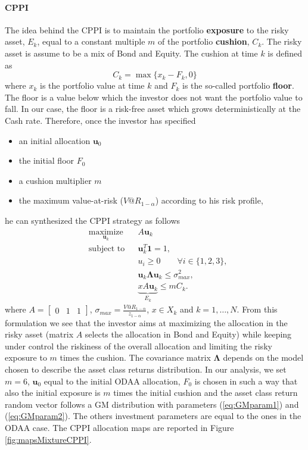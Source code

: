 \paragraph{CPPI}
The idea behind the \gls{CPPI} is to maintain the portfolio \textbf{exposure} to the risky asset, $E_k$, equal to a constant multiple $m$ of the portfolio \textbf{cushion}, $C_k$. The risky asset is assume to be a mix of Bond and Equity. The cushion at time $k$ is defined as
\[
C_k = \max\big\{x_k-F_k,0 \big\}
\]
where $x_k$ is the portfolio value at time $k$ and $F_k$ is the so-called portfolio \textbf{floor}. The floor is a value below which the investor does not want the portfolio value to fall. In our case, the floor is a risk-free asset which grows deterministically at the Cash rate. Therefore, once the investor has specified 
\begin{itemize}
	\item an initial allocation $\bm{u}_0$ 
	\item the initial floor $F_0$ 
	\item a cushion multiplier $m$
	\item the maximum value-at-risk ($V@R_{1-\alpha}$) according to his risk profile,
\end{itemize}
he can synthesized the \gls{CPPI} strategy as follows
\begin{equation*}
\begin{aligned}
& \underset{\bm{u}_k}{\text{maximize}} & &  A\bm{u}_k \\
& \text{subject to} & & \bm{u}_k^T\bm{1}=1, \\
& & & u_i \geq 0 \qquad \forall i \in \{1,2,3\},\\
& & &\bm{u}_k\bm{\Lambda}\bm{u}_k \leq \sigma_{max}^2,\\
& & & \underbrace{xA\bm{u}_k}_{E_k} \leq mC_k.
\end{aligned}
\end{equation*}
where $A=\begin{bmatrix}0 & 1 & 1\end{bmatrix}$, $\sigma_{max}=\frac{V@R_{1-\alpha}}{z_{1-\alpha}}$, $x \in X_k$ and $k = 1,\ldots,N$. From this formulation we see that the investor aims at maximizing the allocation in the risky asset (matrix $A$ selects the allocation in Bond and Equity) while keeping under control the riskiness of the overall allocation and limiting the risky exposure to $m$ times the cushion. The covariance matrix $\bm{\Lambda}$ depends on the model chosen to describe the asset class returns distribution. In our analysis, we set $m=6$, $\bm{u}_0$ equal to the initial ODAA allocation, $F_0$ is chosen in such a way that also the initial exposure is $m$ times the initial cushion and the asset class return random vector follows a GM distribution with parameters (\ref{eq:GMparam1}) and (\ref{eq:GMparam2}). The others investment parameters are equal to the ones in the ODAA case. The CPPI allocation maps are reported in Figure \ref{fig:mapsMixtureCPPI}.




